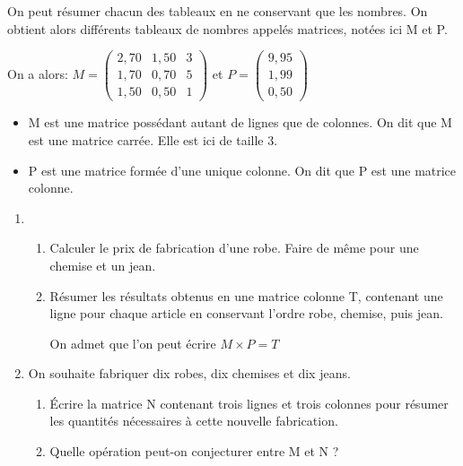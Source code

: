 \documentclass[a4paper]{article}
\begin{document}
\begin{example}{}{}
\bigskip

On peut résumer chacun des tableaux en ne conservant que les nombres. On obtient alors différents tableaux de nombres appelés matrices, notées ici M et P.

On a alors: $M=\begin{pmatrix}
2,70 & 1,50 & 3 \\
1,70 & 0,70 & 5 \\
1,50 & 0,50 & 1 
\end{pmatrix}$ \quad et \quad $P=\begin{pmatrix}
9,95 \\
1,99 \\
0,50 
\end{pmatrix}$

\medskip

\begin{itemize}[label=\textbullet]
	\item M est une matrice possédant autant de lignes que de colonnes. On dit que M est une matrice carrée. Elle est ici de taille 3.

	\item P est une matrice formée d'une unique colonne. On dit que P est une matrice colonne. 
\end{itemize}

\bigskip

\begin{enumerate}
	\item 
	\begin{enumerate}
	\item Calculer le prix de fabrication d'une robe. Faire de même pour une chemise et un jean.
	\item Résumer les résultats obtenus en une matrice colonne T, contenant une ligne pour chaque article en conservant l'ordre robe, chemise, puis jean. 
	
	On admet que l'on peut écrire $M \times P = T$
	\end{enumerate}
	\item On souhaite fabriquer dix robes, dix chemises et dix jeans.
	\begin{enumerate}
		\item Écrire la matrice N contenant trois lignes et trois colonnes pour résumer les quantités nécessaires à cette nouvelle fabrication. 
		\item Quelle opération peut-on conjecturer entre M et N ? 
	\end{enumerate}
\end{enumerate}

\end{example}
\end{document}
